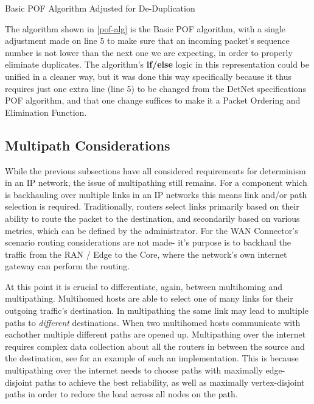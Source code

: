 \begin{algorithm}[H]
\label{pof-alg}


\caption{Basic POF Algorithm Adjusted for De-Duplication}
\end{algorithm}

The algorithm shown in \ref{pof-alg} is the Basic POF algorithm, with a single adjustment made on line 5 to make sure that an incoming packet's sequence number is not lower than the next one we are expecting, in order to properly eliminate duplicates. The algorithm's \textbf{if/else} logic in this representation could be unified in a cleaner way, but it was done this way specifically because it thus requires just one extra line (line 5) to be changed from the DetNet specifications POF algorithm, and that one change suffices to make it a Packet Ordering and Elimination Function.

\subsection{Multipath Considerations}

While the previous subsections have all considered requirements for determinism in an IP network, the issue of multipathing still remains. For a component which is backhauling over multiple links in an IP networks this means link and/or path selection is required. Traditionally, routers select links primarily based on their ability to route the packet to the destination, and secondarily based on various metrics, which can be defined by the administrator. For the WAN Connector's scenario routing considerations are not made- it's purpose is to backhaul the traffic from the RAN / Edge to the Core, where the network's own internet gateway can perform the routing.

At this point it is crucial to differentiate, again, between multihoming and multipathing. Multihomed hosts are able to select one of many links for their outgoing traffic's destination. In multipathing the same link may lead to multiple paths to \textit{different} destinations. When two multihomed hosts communicate with eachother multiple different paths are opened up. Multipathing over the internet requires complex data collection about all the routers in between the source and the destination, see \cite{multipath} for an example of such an implementation. This is because multipathing over the internet needs to choose paths with maximally edge-disjoint paths to achieve the best reliability, as well as maximally vertex-disjoint paths in order to reduce the load across all nodes on the path.

